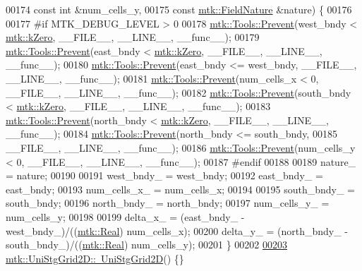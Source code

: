\begin{DoxyCode}
00174                                 \textcolor{keyword}{const} \textcolor{keywordtype}{int} &num\_cells\_y,
00175                                 \textcolor{keyword}{const} \hyperlink{group__c02-enums_ga4c54f2a329cfb4e56213b02a259d19e2}{mtk::FieldNature} &nature) \{
00176 
00177 \textcolor{preprocessor}{  #if MTK\_DEBUG\_LEVEL > 0}
00178   \hyperlink{classmtk_1_1Tools_a332324c6f25e66be9dff48c5987a3b9f}{mtk::Tools::Prevent}(west\_bndy < \hyperlink{group__c01-roots_ga59a451a5fae30d59649bcda274fea271}{mtk::kZero}, \_\_FILE\_\_, \_\_LINE\_\_, \_\_func\_\_);
00179   \hyperlink{classmtk_1_1Tools_a332324c6f25e66be9dff48c5987a3b9f}{mtk::Tools::Prevent}(east\_bndy < \hyperlink{group__c01-roots_ga59a451a5fae30d59649bcda274fea271}{mtk::kZero}, \_\_FILE\_\_, \_\_LINE\_\_, \_\_func\_\_);
00180   \hyperlink{classmtk_1_1Tools_a332324c6f25e66be9dff48c5987a3b9f}{mtk::Tools::Prevent}(east\_bndy <= west\_bndy, \_\_FILE\_\_, \_\_LINE\_\_, \_\_func\_\_);
00181   \hyperlink{classmtk_1_1Tools_a332324c6f25e66be9dff48c5987a3b9f}{mtk::Tools::Prevent}(num\_cells\_x < 0, \_\_FILE\_\_, \_\_LINE\_\_, \_\_func\_\_);
00182   \hyperlink{classmtk_1_1Tools_a332324c6f25e66be9dff48c5987a3b9f}{mtk::Tools::Prevent}(south\_bndy < \hyperlink{group__c01-roots_ga59a451a5fae30d59649bcda274fea271}{mtk::kZero}, \_\_FILE\_\_, \_\_LINE\_\_, \_\_func\_\_);
00183   \hyperlink{classmtk_1_1Tools_a332324c6f25e66be9dff48c5987a3b9f}{mtk::Tools::Prevent}(north\_bndy < \hyperlink{group__c01-roots_ga59a451a5fae30d59649bcda274fea271}{mtk::kZero}, \_\_FILE\_\_, \_\_LINE\_\_, \_\_func\_\_);
00184   \hyperlink{classmtk_1_1Tools_a332324c6f25e66be9dff48c5987a3b9f}{mtk::Tools::Prevent}(north\_bndy <= south\_bndy,
00185                       \_\_FILE\_\_, \_\_LINE\_\_, \_\_func\_\_);
00186   \hyperlink{classmtk_1_1Tools_a332324c6f25e66be9dff48c5987a3b9f}{mtk::Tools::Prevent}(num\_cells\_y < 0, \_\_FILE\_\_, \_\_LINE\_\_, \_\_func\_\_);
00187 \textcolor{preprocessor}{  #endif}
00188 
00189   nature\_ = nature;
00190 
00191   west\_bndy\_ = west\_bndy;
00192   east\_bndy\_ = east\_bndy;
00193   num\_cells\_x\_ = num\_cells\_x;
00194 
00195   south\_bndy\_ = south\_bndy;
00196   north\_bndy\_ = north\_bndy;
00197   num\_cells\_y\_ = num\_cells\_y;
00198 
00199   delta\_x\_ = (east\_bndy\_ - west\_bndy\_)/((\hyperlink{group__c01-roots_gac080bbbf5cbb5502c9f00405f894857d}{mtk::Real}) num\_cells\_x);
00200   delta\_y\_ = (north\_bndy\_ - south\_bndy\_)/((\hyperlink{group__c01-roots_gac080bbbf5cbb5502c9f00405f894857d}{mtk::Real}) num\_cells\_y);
00201 \}
00202 
\hypertarget{mtk__uni__stg__grid__2d_8cc_source_l00203}{}\hyperlink{classmtk_1_1UniStgGrid2D_a55615fed9674be8d8a48a1105e5a1476}{00203} \hyperlink{classmtk_1_1UniStgGrid2D_a55615fed9674be8d8a48a1105e5a1476}{mtk::UniStgGrid2D::~UniStgGrid2D}() \{\}

\end{DoxyCode}
